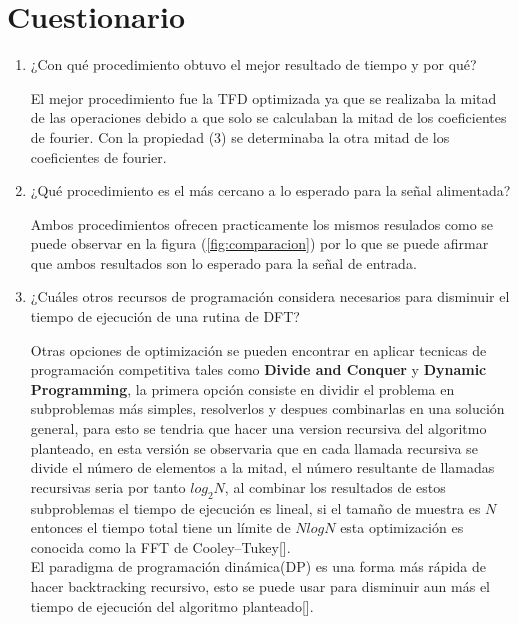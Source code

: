 \documentclass[12pt]{article}
\begin{document}
\section{Cuestionario}
\begin{enumerate}
    \item ¿Con qué procedimiento obtuvo el mejor resultado de tiempo y por qué?
    
    El mejor procedimiento fue la TFD optimizada ya que se realizaba la mitad de las operaciones debido a que solo se calculaban la mitad de los coeficientes de fourier. Con la propiedad (3) se determinaba la otra mitad de los coeficientes de fourier.
    
    \item¿Qué procedimiento es el más cercano a lo esperado para la señal alimentada?
    
    Ambos procedimientos ofrecen practicamente los mismos resulados como se puede observar en la figura (\ref{fig:comparacion}) por lo que se puede afirmar que ambos resultados son lo esperado para la señal de entrada. 
    
    \item¿Cuáles otros recursos de programación considera necesarios para disminuir el tiempo de ejecución de una rutina de DFT?
    
    Otras opciones de optimización se pueden encontrar en aplicar tecnicas de programación competitiva tales como \textbf{Divide and Conquer} y \textbf{Dynamic Programming}, la primera opción consiste en dividir el problema en subproblemas más simples, resolverlos y despues combinarlas en una solución general, para esto se tendria que hacer una version recursiva del algoritmo planteado, en esta versión se observaria que en cada llamada recursiva se divide el número de elementos a la mitad, el número resultante de llamadas recursivas seria por tanto $log_2N$, al combinar los resultados de estos subproblemas el tiempo de ejecución es lineal, si el tamaño de muestra es $N$ entonces el tiempo total tiene un límite de $Nlog N$ esta optimización es conocida como la FFT de Cooley–Tukey[\cite{auslander1996equivariant}].\\
    El paradigma de programación dinámica(DP) es una forma más rápida de hacer backtracking recursivo, esto se puede usar para disminuir aun más el tiempo de ejecución del algoritmo planteado[\cite{halim2013competitive}].
\end{enumerate}
\end{document}

